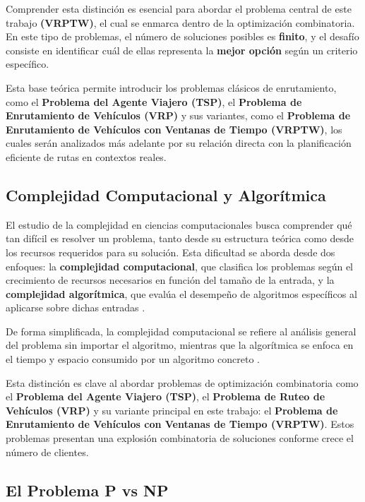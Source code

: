 \documentclass[12pt,titlepage,twoside,openright]{book}
\begin{document}
Comprender esta distinción es esencial para abordar el problema central de este trabajo \textbf{(VRPTW)}, el cual se enmarca dentro de la optimización combinatoria. En este tipo de problemas, el número de soluciones posibles es \textbf{finito}, y el desafío consiste en identificar cuál de ellas representa la \textbf{mejor opción} según un criterio específico.

Esta base teórica permite introducir los problemas clásicos de enrutamiento, como el \textbf{Problema del Agente Viajero (TSP)}, el \textbf{Problema de Enrutamiento de Vehículos (VRP)} y sus variantes, como el \textbf{Problema de Enrutamiento de Vehículos con Ventanas de Tiempo (VRPTW)}, los cuales serán analizados más adelante por su relación directa con la planificación eficiente de rutas en contextos reales.

\subsection{Complejidad Computacional y Algorítmica}

El estudio de la complejidad en ciencias computacionales busca comprender qué tan difícil es resolver un problema, tanto desde su estructura teórica como desde los recursos requeridos para su solución. Esta dificultad se aborda desde dos enfoques: la \textbf{complejidad computacional}, que clasifica los problemas según el crecimiento de recursos necesarios en función del tamaño de la entrada, y la \textbf{complejidad algorítmica}, que evalúa el desempeño de algoritmos específicos al aplicarse sobre dichas entradas \citep{garey1979computers, papadimitriou1994}.

De forma simplificada, la complejidad computacional se refiere al análisis general del problema sin importar el algoritmo, mientras que la algorítmica se enfoca en el tiempo y espacio consumido por un algoritmo concreto \citep{maldonado2013problema}.

Esta distinción es clave al abordar problemas de optimización combinatoria como el \textbf{Problema del Agente Viajero (TSP)}, el \textbf{Problema de Ruteo de Vehículos (VRP)} y su variante principal en este trabajo: el \textbf{Problema de Enrutamiento de Vehículos con Ventanas de Tiempo (VRPTW)}. Estos problemas presentan una explosión combinatoria de soluciones conforme crece el número de clientes.

\subsection{El Problema P vs NP}
\end{document}
